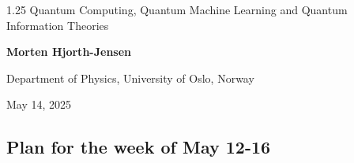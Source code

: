 \documentclass[%
oneside,                 %
final,                   %
10pt]{article}
\begin{document}

\newcommand{\exercisesection}[1]{\subsection*{#1}}






\thispagestyle{empty}

\begin{center}
{\LARGE\bf
\begin{spacing}{1.25}
Quantum Computing, Quantum Machine Learning and Quantum Information Theories
\end{spacing}
}
\end{center}


\begin{center}
{\bf Morten Hjorth-Jensen}
\end{center}

    \begin{center}
\centerline{{\small Department of Physics, University of Oslo, Norway}}
\end{center}
    

\begin{center}
May 14, 2025
\end{center}

\vspace{1cm}


\subsection{Plan for the week of May 12-16}

\end{document}
